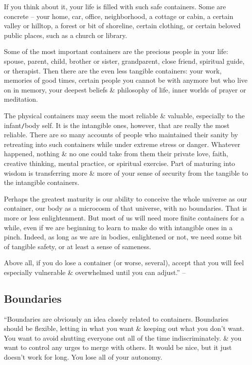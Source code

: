 \documentclass{article}
\numberwithin{equation}{section}
\begin{document}
If you think about it, your life is filled with such safe containers. Some are concrete -- your home, car, office, neighborhood, a cottage or cabin, a certain valley or hilltop, a forest or bit of shoreline, certain clothing, or certain beloved public places, such as a church or library.

Some of the most important containers are the precious people in your life: spouse, parent, child, brother or sister, grandparent, close friend, spiritual guide, or therapist. Then there are the even less tangible containers: your work, memories of good times, certain people you cannot be with anymore but who live on in memory, your deepest beliefs \& philosophy of life, inner worlds of prayer or meditation.

The physical containers may seem the most reliable \& valuable, especially to the infant{\tt/}body self. It is the intangible ones, however, that are really the most reliable. There are so many accounts of people who maintained their sanity by retreating into such containers while under extreme stress or danger. Whatever happened, nothing \& no one could take from them their private love, faith, creative thinking, mental practice, or spiritual exercise. Part of maturing into wisdom is transferring more \& more of your sense of security from the tangible to the intangible containers.

Perhaps the greatest maturity is our ability to conceive the whole universe as our container, our body as a microcosm of that universe, with no boundaries. That is more or less enlightenment. But most of us will need more finite containers for a while, even if we are beginning to learn to make do with intangible ones in a pinch. Indeed, as long as we are in bodies, enlightened or not, we need some bit of tangible safety, or at least a sense of sameness.

Above all, if you do lose a container (or worse, several), accept that you will feel especially vulnerable \& overwhelmed until you can adjust.'' -- \cite[pp. 93--94]{Aron2013}

\subsection{Boundaries}
``Boundaries are obviously an idea closely related to containers. Boundaries should be flexible, letting in what you want \& keeping out what you don't want. You want to avoid shutting everyone out all of the time indiscriminately. \& you want to control any urges to merge with others. It would be nice, but it just doesn't work for long. You lose all of your autonomy.
\end{document}
